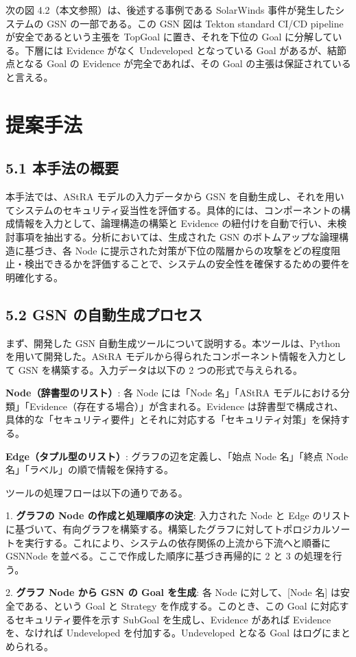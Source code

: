 \documentclass[paper]{ieicej} %
\begin{document}
次の図 4.2（本文参照）は、後述する事例である SolarWinds 事件が発生したシステムの GSN の一部である。この GSN 図は Tekton standard CI/CD pipeline が安全であるという主張を TopGoal に置き、それを下位の Goal に分解している。下層には Evidence がなく Undeveloped となっている Goal があるが、結節点となる Goal の Evidence が完全であれば、その Goal の主張は保証されていると言える。

\section{提案手法}
\subsection{5.1 本手法の概要}
本手法では、AStRA モデルの入力データから GSN を自動生成し、それを用いてシステムのセキュリティ妥当性を評価する。具体的には、コンポーネントの構成情報を入力として、論理構造の構築と Evidence の紐付けを自動で行い、未検討事項を抽出する。分析においては、生成された GSN のボトムアップな論理構造に基づき、各 Node に提示された対策が下位の階層からの攻撃をどの程度阻止・検出できるかを評価することで、システムの安全性を確保するための要件を明確化する。

\subsection{5.2 GSN の自動生成プロセス}
まず、開発した GSN 自動生成ツールについて説明する。本ツールは、Python を用いて開発した。AStRA モデルから得られたコンポーネント情報を入力として GSN を構築する。入力データは以下の 2 つの形式で与えられる。

\textbf{Node（辞書型のリスト）}: 各 Node には「Node 名」「AStRA モデルにおける分類」「Evidence（存在する場合）」が含まれる。Evidence は辞書型で構成され、具体的な「セキュリティ要件」とそれに対応する「セキュリティ対策」を保持する。

\textbf{Edge（タプル型のリスト）}: グラフの辺を定義し、「始点 Node 名」「終点 Node 名」「ラベル」の順で情報を保持する。

ツールの処理フローは以下の通りである。

1. \textbf{グラフの Node の作成と処理順序の決定}: 入力された Node と Edge のリストに基づいて、有向グラフを構築する。構築したグラフに対してトポロジカルソートを実行する。これにより、システムの依存関係の上流から下流へと順番に GSNNode を並べる。ここで作成した順序に基づき再帰的に 2 と 3 の処理を行う。

2. \textbf{グラフ Node から GSN の Goal を生成}: 各 Node に対して、[Node 名] は安全である、という Goal と Strategy を作成する。このとき、この Goal に対応するセキュリティ要件を示す SubGoal を生成し、Evidence があれば Evidence を、なければ Undeveloped を付加する。Undeveloped となる Goal はログにまとめられる。
\end{document}
